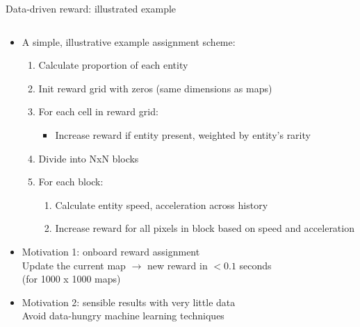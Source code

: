 \documentclass[9pt,xcolor=table]{beamer}
\begin{document}
\begin{frame}{Data-driven reward: illustrated example}
\begin{columns}
\begin{column}{0.25\textwidth}
        \end{column}
    \end{columns}
    
    \begin{itemize}
        \item A simple, illustrative example assignment scheme:
        \begin{enumerate}
            \item Calculate proportion of each entity
            \item Init reward grid with zeros (same dimensions as maps)
            \item For each cell in reward grid:
            \begin{itemize}
                \item Increase reward if entity present, weighted by entity's rarity
            \end{itemize}
            \item Divide into NxN blocks
            \item For each block:
            \begin{enumerate}
                \item Calculate entity speed, acceleration across history
                \item Increase reward for all pixels in block based on speed and acceleration
            \end{enumerate}
        \end{enumerate}
        \item Motivation 1: onboard reward assignment \\
        Update the current map $\rightarrow$ new reward in $<0.1$ seconds \\ (for 1000 x 1000 maps)
        \item Motivation 2: sensible results with very little data \\ Avoid data-hungry machine learning techniques
    \end{itemize}
\end{frame}
\end{document}
